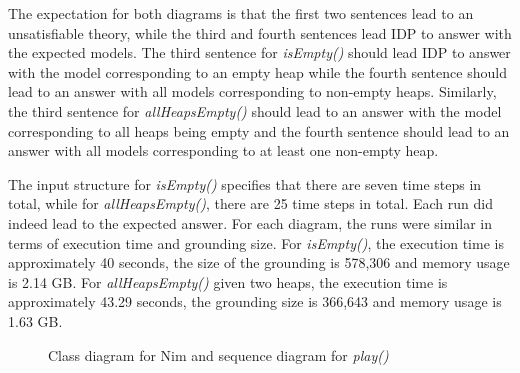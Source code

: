 \documentclass[conference]{IEEEtran}
\begin{document}
The expectation for both diagrams is that the first two sentences lead to an unsatisfiable theory, while the third and fourth sentences lead IDP to answer with the expected models. The third sentence for \textit{isEmpty()} should lead IDP to answer with the model corresponding to an empty heap while the fourth sentence should lead to an answer with all models corresponding to non-empty heaps. Similarly, the third sentence for \textit{allHeapsEmpty()} should lead to an answer with the model corresponding to all heaps being empty and the fourth sentence should lead to an answer with all models corresponding to at least one non-empty heap.

The input structure for \textit{isEmpty()} specifies that there are seven time steps in total, while for \textit{allHeapsEmpty()}, there are 25 time steps in total. Each run did indeed lead to the expected answer. For each diagram, the runs were similar in terms of execution time and grounding size. For \textit{isEmpty()}, the execution time is approximately 40 seconds, the size of the grounding is 578,306 and memory usage is 2.14 GB. For \textit{allHeapsEmpty()} given two heaps, the execution time is approximately 43.29 seconds, the grounding size is 366,643 and memory usage is 1.63 GB.

\begin{figure}[!t]
	\centering
	\hfil
		\label{fig:play}
	\caption{Class diagram for Nim and sequence diagram for \textit{play()}}
	\label{fig:nim-cd-play}
\end{figure}
\end{document}
